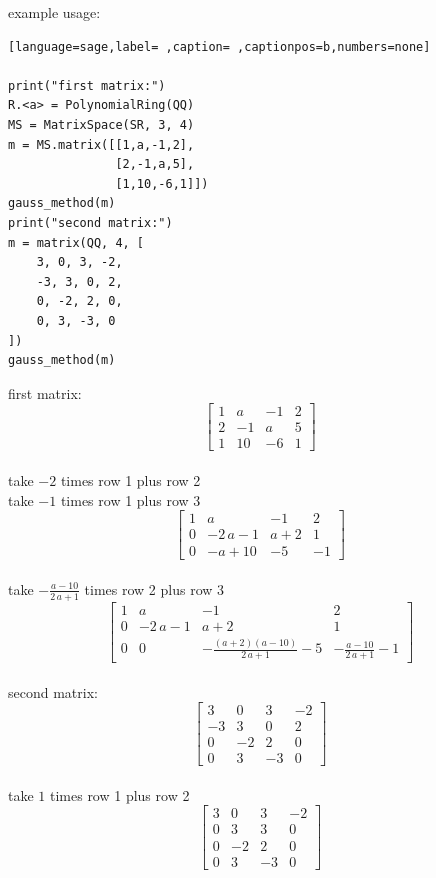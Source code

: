 \documentclass[a4paper,12pt]{article}
\begin{document}
example usage:\\[0pt]
\begin{lstlisting}[language=sage,label= ,caption= ,captionpos=b,numbers=none]

print("first matrix:")
R.<a> = PolynomialRing(QQ)
MS = MatrixSpace(SR, 3, 4)
m = MS.matrix([[1,a,-1,2],
               [2,-1,a,5],
               [1,10,-6,1]])
gauss_method(m)
print("second matrix:")
m = matrix(QQ, 4, [
    3, 0, 3, -2,
    -3, 3, 0, 2,
    0, -2, 2, 0,
    0, 3, -3, 0
])
gauss_method(m)
\end{lstlisting}

first matrix:\\[0pt]
\[\left[\begin{array}{rrrr} 1 & a & -1 & 2 \\ 2 & -1 & a & 5 \\ 1 & 10 & -6 & 1 \end{array}\right]\]\\[0pt]
take \(-2\) times row 1 plus row 2\\[0pt]
take \(-1\) times row 1 plus row 3\\[0pt]
\[\left[\begin{array}{rrrr} 1 & a & -1 & 2 \\ 0 & -2 \, a - 1 & a + 2 & 1 \\ 0 & -a + 10 & -5 & -1 \end{array}\right]\]\\[0pt]
take \(-\frac{a - 10}{2 \, a + 1}\) times row 2 plus row 3\\[0pt]
\[\left[\begin{array}{rrrr} 1 & a & -1 & 2 \\ 0 & -2 \, a - 1 & a + 2 & 1 \\ 0 & 0 & -\frac{{\left(a + 2\right)} {\left(a - 10\right)}}{2 \, a + 1} - 5 & -\frac{a - 10}{2 \, a + 1} - 1 \end{array}\right]\]\\[0pt]
second matrix:\\[0pt]
\[\left[\begin{array}{rrrr} 3 & 0 & 3 & -2 \\ -3 & 3 & 0 & 2 \\ 0 & -2 & 2 & 0 \\ 0 & 3 & -3 & 0 \end{array}\right]\]\\[0pt]
take \(1\) times row 1 plus row 2\\[0pt]
\[\left[\begin{array}{rrrr} 3 & 0 & 3 & -2 \\ 0 & 3 & 3 & 0 \\ 0 & -2 & 2 & 0 \\ 0 & 3 & -3 & 0 \end{array}\right]\]\\[0pt]
\end{document}
